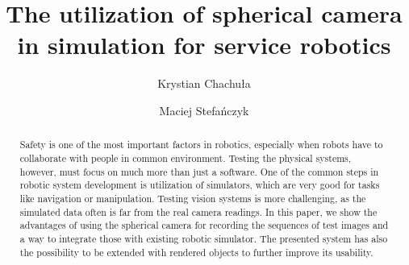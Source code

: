 \documentclass{svproc}
\begin{document}
\mainmatter

\title{The utilization of spherical camera in simulation for service robotics}

\author{Krystian Chachuła \and Maciej Stefańczyk}


\maketitle

\begin{abstract}

    Safety is one of the most important factors in robotics, especially when robots have to 
    collaborate with people in common environment. Testing the physical systems, however, must
    focus on much more than just a software. One of the common steps in robotic system development
    is utilization of simulators, which are very good for tasks like navigation or manipulation.
    Testing vision systems is more challenging, as the simulated data often is far from the
    real camera readings. In this paper, we show the advantages of using the spherical camera
    for recording the sequences of test images and a way to integrate those with existing
    robotic simulator. The presented system has also the possibility to be extended with rendered
    objects to further improve its usability.


\end{abstract}
\end{document}
